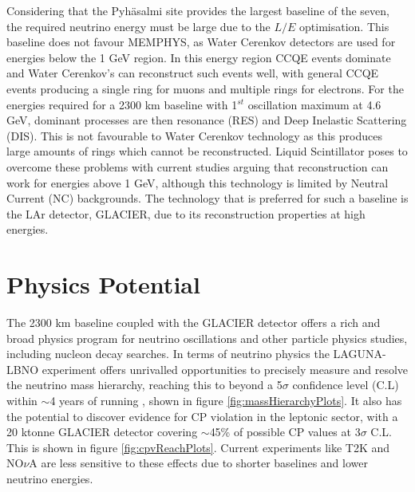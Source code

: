Considering that the Pyh\"asalmi site provides the largest baseline of the seven, the required neutrino energy must be large due to the $L/E$ optimisation. This baseline does not favour MEMPHYS, as Water Cerenkov detectors are used for energies below the 1 GeV region.  In this energy region CCQE events dominate and Water Cerenkov's can reconstruct such events well, with general CCQE events producing a single ring for muons and multiple rings for electrons. For the energies required for a 2300 km baseline with 1$^{st}$ oscillation maximum at 4.6 GeV, dominant processes are then resonance (RES) and Deep Inelastic Scattering (DIS). This is not favourable to Water Cerenkov technology as this produces large amounts of rings which cannot be reconstructed. Liquid Scintillator poses to overcome these problems with current studies \cite{LENA} arguing that reconstruction can work for energies above 1 GeV, although this technology is limited by Neutral Current (NC) backgrounds. The technology that is preferred for such a baseline is the LAr detector, GLACIER, due to its reconstruction properties at high energies.

\section{Physics Potential}
The 2300 km baseline coupled with the GLACIER detector offers a rich and broad physics program for neutrino oscillations and other particle physics studies, including nucleon decay searches. In terms of neutrino physics the LAGUNA-LBNO experiment offers unrivalled opportunities to precisely measure and resolve the neutrino mass hierarchy, reaching this to beyond a 5$\sigma$ confidence level (C.L) within $\sim$4 years of running \cite{lbnoInternal}, shown in figure \ref{fig:massHierarchyPlots}. It also has the potential to discover evidence for CP violation in the leptonic sector, with a 20 ktonne GLACIER detector covering $\sim$45\% of possible CP values at 3$\sigma$ C.L. This is shown in figure \ref{fig:cpvReachPlots}. Current experiments like T2K and NO$\nu$A are less sensitive to these effects due to shorter baselines and lower neutrino energies.

